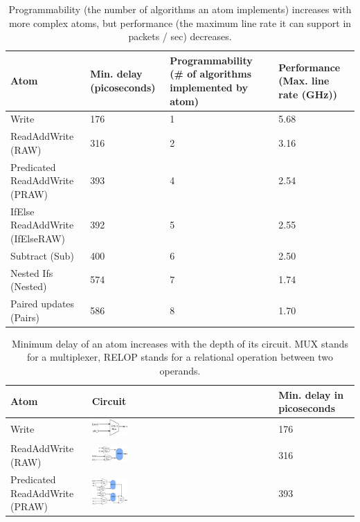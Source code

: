 \begin{table}[!t]
  \begin{scriptsize}
  \begin{tabular}{|p{}|p{}|p{}|p{}|}
  \hline
  Atom & Min. delay (picoseconds) & Programmability (\# of algorithms implemented by atom) & Performance (Max. line rate (GHz)) \\
  \hline
  Write & 176 & 1  & 5.68 \\
  \hline
  ReadAddWrite (RAW) & 316 & 2 & 3.16\\
  \hline
  \pbox{0.1\textwidth}
  {Predicated\\
  ReadAddWrite (PRAW)} & 393 & 4 & 2.54 \\
  \hline
  IfElse ReadAddWrite (IfElseRAW) & 392 & 5 & 2.55 \\
  \hline
  Subtract (Sub) & 400 & 6 & 2.50 \\
  \hline
  Nested Ifs (Nested) & 574 & 7 & 1.74 \\
  \hline
  Paired updates (Pairs) & 586 & 8 & 1.70 \\
  \hline
  \end{tabular}
\end{scriptsize}
\caption{Programmability (the number of algorithms an atom implements)
  increases with more complex atoms, but performance (the maximum line
rate it can support in packets / sec) decreases.}
  \label{tab:perfprog}
\end{table}

\begin{table}[!t]
  \begin{scriptsize}
    \begin{tabular}{|p{}|p{}|p{}|}
  \hline
  Atom & Circuit & Min. delay in picoseconds \\
  \hline
  Write & \includegraphics[width=0.2\textwidth]{rw.pdf} & 176 \\
  \hline
  ReadAddWrite (RAW) & \includegraphics[width=0.2\textwidth]{raw.pdf} & 316\\
  \hline
  \pbox{0.1\textwidth}
  {Predicated\\
  ReadAddWrite (PRAW)} & \includegraphics[width=0.2\textwidth]{pred_raw.pdf}  & 393 \\
  \hline
  \end{tabular}
\end{scriptsize}
\caption{Minimum delay of an atom increases with the depth of its circuit. MUX stands
         for a multiplexer, RELOP stands for a relational operation between two operands.}
  \label{tab:circuits}
\end{table}


